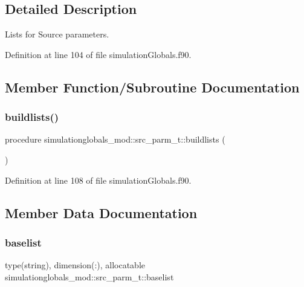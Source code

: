 \subsection{Detailed Description}
Lists for Source parameters. 

Definition at line 104 of file simulation\+Globals.\+f90.



\subsection{Member Function/\+Subroutine Documentation}
\mbox{\label{structsimulationglobals__mod_1_1src__parm__t_a0dd15ea4d9d7bb28eb4bca8a3a4262f1}} 
\subsubsection{\texorpdfstring{buildlists()}{buildlists()}}
{\footnotesize\ttfamily procedure simulationglobals\+\_\+mod\+::src\+\_\+parm\+\_\+t\+::buildlists (\begin{DoxyParamCaption}{ }\end{DoxyParamCaption})\hspace{0.3cm}{\ttfamily [private]}}



Definition at line 108 of file simulation\+Globals.\+f90.



\subsection{Member Data Documentation}
\mbox{\label{structsimulationglobals__mod_1_1src__parm__t_ad17cf719066b0385f9e88a09ea61071b}} 
\subsubsection{\texorpdfstring{baselist}{baselist}}
{\footnotesize\ttfamily type(string), dimension(\+:), allocatable simulationglobals\+\_\+mod\+::src\+\_\+parm\+\_\+t\+::baselist\hspace{0.3cm}{\ttfamily [private]}}



